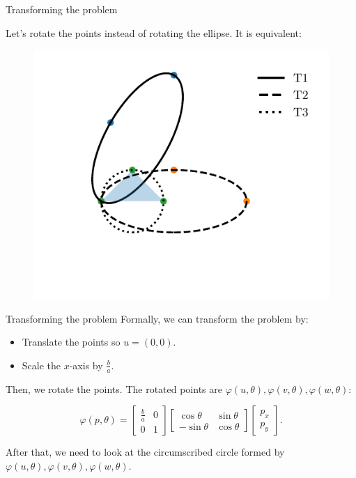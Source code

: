 \documentclass{beamer}
\begin{document}
\begin{frame}{Transforming the problem}
	
	Let's rotate the points instead of rotating the ellipse. It is equivalent:
	
	\begin{figure}
		\centering
		\includegraphics{circumscribed-circle}
		\caption{}
		\label{fig:circumscribed-circle}
	\end{figure}
\end{frame}

\begin{frame}{Transforming the problem}
	Formally, we can transform the problem by:
	
	\begin{itemize}
		\item Translate the points so $u=(0, 0)$.
		\item Scale the $x$-axis by $\frac{b}{a}$.
	\end{itemize}

	Then, we rotate the points. The rotated points are $\varphi(u, \theta), \varphi(v, \theta), \varphi(w, \theta)$:
	
	\begin{equation*}\label{eq:trpnts}
	\varphi(p, \theta)=\left[\begin{array}{cc}
	\frac{b}{a}&0\\
	0&1
	\end{array}\right]
	\left[\begin{array}{cc}
	\cos{\theta}&\sin{\theta}\\
	-\sin{\theta}&\cos{\theta}
	\end{array}\right]\left[\begin{array}{c}
	p_x\\
	p_y
	\end{array}\right].
	\end{equation*}
	
	After that, we need to look at the circumscribed circle formed by $\varphi(u, \theta), \varphi(v, \theta), \varphi(w, \theta)$.
\end{frame}
	
\end{document}
